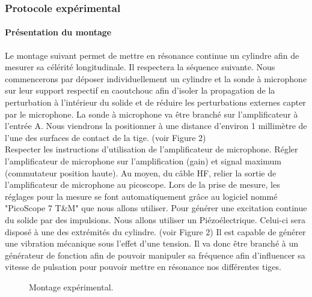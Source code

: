 \newpage

\subsubsection{\large Protocole expérimental}
\paragraph{Présentation du montage}
Le montage suivant permet de mettre en résonance continue un cylindre afin 
de mesurer sa célérité longitudinale. Il respectera la séquence suivante. 
Nous commencerons par déposer individuellement un cylindre et 
la sonde à microphone sur leur support respectif en caoutchouc afin 
d'isoler la propagation de la perturbation à l'intérieur du solide et 
de réduire les perturbations externes capter par le microphone.
La sonde à microphone va être branché sur l'amplificateur à l'entrée A.
Nous viendrons la positionner à une distance d'environ 1 millimètre de 
l'une des surfaces de contact de la tige. (voir Figure 2)\\
Respecter les instructions d'utilisation de l'amplificateur de microphone.
Régler l'amplificateur de microphone sur l'amplification (gain) et signal 
maximum (commutateur position haute). Au moyen, du câble HF, relier la sortie 
de l'amplificateur de microphone au picoscope. Lors de la prise de mesure, 
les réglages pour la mesure se font automatiquement grâce au logiciel nommé
"PicoScope 7 T\&M" que nous allons utiliser.
Pour générer une excitation continue du solide par des impulsions.
Nous allons utiliser un Piézoélectrique. Celui-ci sera disposé à 
une des extrémités du cylindre. (voir Figure 2)
Il est capable de générer une vibration mécanique sous l'effet d'une tension.
Il va donc être branché à un générateur de fonction afin de pouvoir 
manipuler sa fréquence afin d'influencer sa vitesse de pulsation pour 
pouvoir mettre en résonance nos différentes tiges.

\begin{figure}[h]
    \centering
    \caption{Montage expérimental.~\cite{rapport-heig}}
\end{figure}

